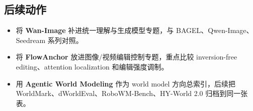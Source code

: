 \subsection{后续动作}

\begin{itemize}[leftmargin=1.5em]
  \item 将 \textbf{Wan-Image} 补进统一理解与生成模型专题，与 BAGEL、Qwen-Image、Seedream 系列对照。
  \item 将 \textbf{FlowAnchor} 放进图像/视频编辑控制专题，重点比较 inversion-free editing、attention localization 和编辑强度调制。
  \item 用 \textbf{Agentic World Modeling} 作为 world model 方向总索引，后续把 WorldMark、dWorldEval、RoboWM-Bench、HY-World 2.0 归档到同一张表。
\end{itemize}
